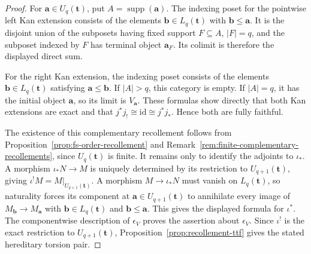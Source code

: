 \documentclass[12pt,reqno]{amsart}
\theoremstyle{definition}
\theoremstyle{remark}
\begin{document}
\begin{proof}
For $\mathbf a\in U_q(\mathbf t)$, put $A=\operatorname{supp}(\mathbf a)$.  The indexing poset for the pointwise left Kan extension consists of the elements $\mathbf b\in L_q(\mathbf t)$ with $\mathbf b\le\mathbf a$.  It is the disjoint union of the subposets having fixed support $F\subseteq A$, $|F|=q$, and the subposet indexed by $F$ has terminal object $\mathbf a_F$.  Its colimit is therefore the displayed direct sum.

For the right Kan extension, the indexing poset consists of the elements $\mathbf b\in L_q(\mathbf t)$ satisfying $\mathbf a\le\mathbf b$.  If $|A|>q$, this category is empty.  If $|A|=q$, it has the initial object $\mathbf a$, so its limit is $V_{\mathbf a}$.  These formulas show directly that both Kan extensions are exact and that $j^*j_!\cong\mathrm{id}\cong j^*j_*$.  Hence both are fully faithful.

The existence of this complementary recollement follows from
Proposition~\ref{prop:fs-order-recollement} and
Remark~\ref{rem:finite-complementary-recollements}, since
$U_q(\mathbf t)$ is finite.  It remains only to identify the adjoints to
$\iota_*$.  A morphism
$\iota_*N\to M$ is uniquely determined by its restriction to
$U_{q+1}(\mathbf t)$, giving
$\iota^!M=M|_{U_{q+1}(\mathbf t)}$.  A morphism $M\to\iota_*N$ must vanish
on $L_q(\mathbf t)$, so naturality forces its component at
$\mathbf a\in U_{q+1}(\mathbf t)$ to annihilate every image of
$M_{\mathbf b}\to M_{\mathbf a}$ with $\mathbf b\in L_q(\mathbf t)$ and
$\mathbf b\le\mathbf a$.  This gives the displayed formula for $\iota^*$.
The componentwise description of $\epsilon_V$ proves the assertion about
$\epsilon_V$.  Since $\iota^!$ is the exact restriction to
$U_{q+1}(\mathbf t)$, Proposition~\ref{prop:recollement-ttf} gives the stated
hereditary torsion pair.
\end{proof}
\end{document}
